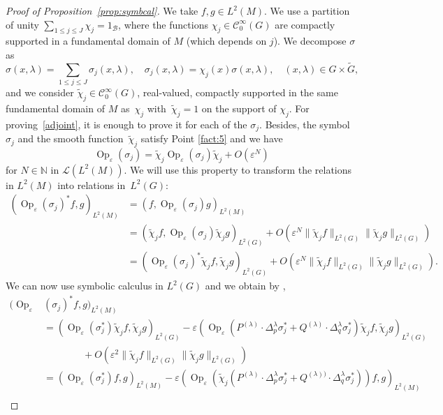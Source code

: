 \documentclass[10pt]{amsart}
\let\mathcal\mathscr
\DeclareMathOperator{\Op}{Op}
\theoremstyle{plain}
\theoremstyle{definition}
\let\eps\varepsilon
\def\N{{\mathbb N}}
\begin{document}
\begin{proof}[Proof of Proposition~\ref{prop:symbcal}]
We take $f,g\in L^2(M)$. We use a partition of unity
$\sum_{1\leq j\leq J} \chi_j= 1_{\mathcal B}$, where the functions $\chi_j\in \mathcal C^\infty_0(G)$ are compactly supported in a fundamental domain of $M$ (which depends on $j$). We decompose $\sigma$ as
\[
\sigma(x,\lambda)= \sum_{1\leq j\leq J}\sigma_j(x,\lambda),\quad \sigma_j(x,\lambda)= \chi_j(x) \sigma(x,\lambda),\quad (x,\lambda)\in G\times \widetilde G,
\]
and we consider $\widetilde \chi_j\in\mathcal C^\infty_0(G)$, real-valued, compactly supported in the same fundamental domain of $M$ as~$\chi_j$ with~$\widetilde \chi_j=1$ on the support of $\chi_j$. For proving~\eqref{adjoint}, it is enough to prove it for each of the $\sigma_j$. Besides, the symbol $\sigma_j$ and the smooth function~$\widetilde \chi_j$ satisfy Point \eqref{fact:5} and we have
\[
\Op_\eps(\sigma_j)= \widetilde \chi_j\Op_\eps (\sigma_j)\widetilde \chi_j +O(\eps^N)
\]
for $N\in\N$
in $\mathcal L (L^2(M))$. We will use this property to transform the relations in $L^2(M)$ into relations in~$L^2(G)$:
\begin{align*}
\left(\Op_\eps (\sigma_j)^* f,g\right)_{L^2(M)}&= \left(f, \Op_\eps (\sigma_j) g\right)_{L^2(M)}\\
&= \left(\widetilde \chi _j f, \Op_\eps (\sigma_j) \widetilde \chi_j g\right)_{L^2(G)}+ O(\eps^N \|\widetilde \chi_j f\|_{L^2(G)} \|\widetilde\chi_j g\|_{L^2(G)})\\
&= \left(\Op_\eps (\sigma_j)^* \widetilde \chi_j f,\widetilde \chi_j g\right)_{L^2(G)} + O(\eps^N \|\widetilde\chi_j f\|_{L^2(G)} \|\widetilde\chi_j g\|_{L^2(G)}).
\end{align*}
We can now use symbolic calculus in $L^2(G)$ and we obtain by
\cite[Prop.\,3.6]{FF1},
\begin{align*}
\bigl(\Op_\eps &(\sigma_j)^* f,g\bigr)_{L^2(M)}\\
&= \left(\Op_\eps (\sigma_j^*) \widetilde \chi_j f,\widetilde \chi_j g\right)_{L^2(G)}
-{\eps} (\Op_\eps(P^{(\lambda)}\cdot \Delta^\lambda_p \sigma_j^*+Q^{(\lambda)}\cdot \Delta^\lambda_q \sigma_j^*)\widetilde \chi_j f,\widetilde \chi_j g)_{L^2(G)} \\
&\qquad \qquad+O(\eps^2 \|\widetilde\chi_j f\|_{L^2(G)} \|\widetilde \chi_j g\|_{L^2(G)})\\
&= \left(\Op_\eps (\sigma_j^*) f, g\right)_{L^2(M)} -{\eps} (\Op_\eps(\widetilde \chi_j (P^{(\lambda)}\cdot \Delta^\lambda_p \sigma_j^*+Q^{(\lambda))}\cdot \Delta^\lambda_q \sigma_j^*)) f,g)_{L^2(M)} \\

\end{align*}
\end{proof}
\end{document}
